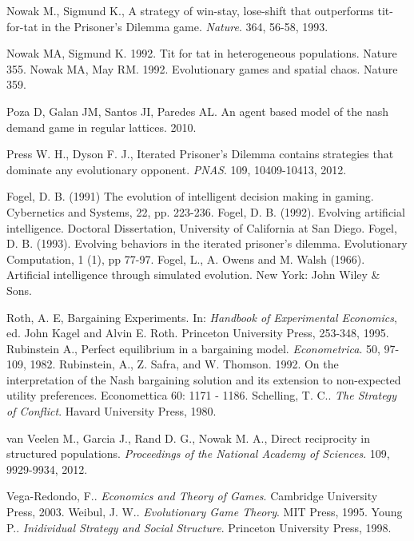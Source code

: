 \documentclass[12.5pt]{report}
\begin{document}
\begin{thebibliography}{}
 Nowak M., Sigmund K., A strategy of win-stay, lose-shift that outperforms tit-for-tat in the Prisoner's Dilemma game. {\emph{Nature}}. 364, 56-58, 1993. 

 Nowak MA, Sigmund K. 1992. Tit for tat in heterogeneous populations. Nature 355.
 Nowak MA, May RM. 1992. Evolutionary games and spatial chaos. Nature 359.

 Poza D, Galan JM, Santos JI, Paredes AL. An agent based model of the nash demand game in regular lattices. 2010.

 Press W. H., Dyson F. J., Iterated Prisoner's Dilemma contains strategies that dominate any evolutionary opponent. {\emph{PNAS}}. 109, 10409-10413, 2012. 

 Fogel, D. B. (1991) The evolution of intelligent decision making in gaming. Cybernetics and Systems, 22, pp. 223-236.
Fogel, D. B. (1992). Evolving artificial intelligence. Doctoral Dissertation, University of California at San Diego.
Fogel, D. B. (1993). Evolving behaviors in the iterated prisoner’s dilemma. Evolutionary Computation, 1 (1), pp 77-97.
Fogel, L., A. Owens and M. Walsh (1966). Artificial intelligence through simulated evolution. New York: John Wiley \& Sons.

 Roth, A. E, Bargaining Experiments. In: {\emph{Handbook of Experimental Economics}}, ed. John Kagel and Alvin E. Roth. Princeton University Press, 253-348, 1995. 
 Rubinstein A., Perfect equilibrium in a bargaining model. {\emph{Econometrica}}. 50, 97-109, 1982. 
 Rubinstein, A., Z. Safra, and W. Thomson. 1992. On the interpretation of the Nash bargaining solution and its extension to non-expected utility preferences.
Economettica 60: 1171 - 1186.
 Schelling, T. C.. {\emph{The Strategy of Conflict}}. Havard University Press, 1980. 

 van Veelen M., Garcia J., Rand D. G., Nowak M. A., Direct reciprocity in structured populations. {\emph{Proceedings of the National Academy of Sciences}}. 109, 9929-9934, 2012. 

 Vega-Redondo, F.. {\emph{Economics and Theory of Games}}. Cambridge University Press, 2003. 
 Weibul, J. W.. {\emph{Evolutionary Game Theory}}. MIT Press, 1995. 
 Young P.. {\emph{Inidividual Strategy and Social Structure}}. Princeton University Press, 1998.






\end{thebibliography}
\end{document}
